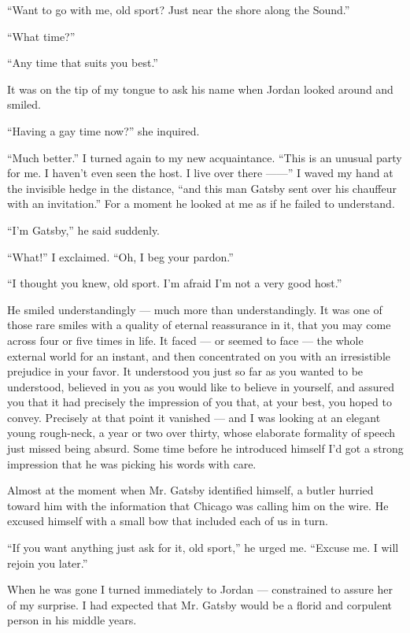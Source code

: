 \documentclass{znotebook}
\begin{document}
``Want to go with me, old sport? Just near the shore along the Sound.''

``What time?''

``Any time that suits you best.''

It was on the tip of my tongue to ask his name when Jordan looked around and smiled.

``Having a gay time now?'' she inquired.

``Much better.'' I turned again to my new acquaintance. ``This is an unusual party for me. I haven’t even seen the host. I live over there ——'' I waved my hand at the invisible hedge in the distance, ``and this man Gatsby sent over his chauffeur with an invitation.'' For a moment he looked at me as if he failed to understand.

``I’m Gatsby,'' he said suddenly.

``What!'' I exclaimed. ``Oh, I beg your pardon.''

``I thought you knew, old sport. I’m afraid I’m not a very good host.''

He smiled understandingly — much more than understandingly. It was one of those rare smiles with a quality of eternal reassurance in it, that you may come across four or five times in life. It faced — or seemed to face — the whole external world for an instant, and then concentrated on you with an irresistible prejudice in your favor. It understood you just so far as you wanted to be understood, believed in you as you would like to believe in yourself, and assured you that it had precisely the impression of you that, at your best, you hoped to convey. Precisely at that point it vanished — and I was looking at an elegant young rough-neck, a year or two over thirty, whose elaborate formality of speech just missed being absurd. Some time before he introduced himself I’d got a strong impression that he was picking his words with care.

Almost at the moment when Mr. Gatsby identified himself, a butler hurried toward him with the information that Chicago was calling him on the wire. He excused himself with a small bow that included each of us in turn.

``If you want anything just ask for it, old sport,'' he urged me. ``Excuse me. I will rejoin you later.''

When he was gone I turned immediately to Jordan — constrained to assure her of my surprise. I had expected that Mr. Gatsby would be a florid and corpulent person in his middle years.
\end{document}
